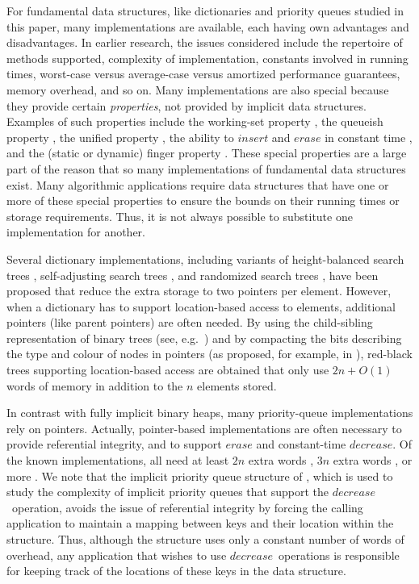 \documentclass{DIKU-article}
\newcommand{\Insert}{\mbox{$\mathit{insert}$}}
\newcommand{\Erase}{\mbox{$\mathit{erase}$}}
\newcommand{\Decrease}{\mbox{$\mathit{decrease}$}}
\begin{document}
For fundamental data structures, like dictionaries and
priority queues studied in this paper, many implementations
are available, each having own advantages and disadvantages.  In
earlier research, the issues considered include the repertoire of
methods supported, complexity of implementation, constants involved
in running times, worst-case versus average-case versus amortized
performance guarantees, memory overhead, and so on.  Many
implementations are also special because they provide certain
\emph{properties}, not provided by implicit data structures.  Examples
of such properties include the working-set property \cite{i01,st85b},
the queueish property \cite{il02}, the unified property
\cite{i01,st85b}, the ability to \Insert{} and \Erase{} in constant
time \cite{Fle96,hm82,LO88}, and the (static or dynamic) finger
property \cite{as96,bt80,c95,gmpr77,hm82}.  These special properties
are a large part of the reason that so many implementations of
fundamental data structures exist.  Many algorithmic applications require
data structures that have one or more of these special properties to ensure the
bounds on their running times or storage requirements.  Thus, it is
not always possible to substitute one implementation for another.

Several dictionary implementations, including variants of
height-balanced search trees \cite{Bro79}, self-adjusting search trees
\cite{And99,gr93,st85b}, and randomized search trees \cite{as96,p90},
have been proposed that reduce the extra storage to two pointers per
element. However, when a dictionary has to support
location-based access to elements, additional pointers (like parent
pointers) are often needed. By using the child-sibling representation
of binary trees (see, e.g.~\cite[Section 4.1]{Tar83}) and by
compacting the bits describing the type and colour of nodes in pointers (as proposed, for example, in
\cite{BK06}), red-black trees supporting location-based access are
obtained that only use $2n + O(1)$ words of memory in addition to the
$n$ elements stored.

In contrast with fully implicit binary heaps, many priority-queue
implementations rely on pointers. Actually, pointer-based
implementations are often necessary to provide referential integrity,
and to support \Erase{} and constant-time \Decrease{}. Of the known
implementations, all need at least $2n$ extra words \cite{DW93,MP05},
$3n$ extra words \cite{EJK05}, or more \cite{DGST88,KST02}.  We note
that the implicit priority queue structure of \cite{MP05}, which is
used to study the complexity of implicit priority queues that support
the \Decrease\ operation, avoids the issue of referential integrity
by forcing the calling application to maintain a mapping between keys
and their location within the structure.  Thus, although the
structure uses only a constant number of words of overhead, any
application that wishes to use \Decrease\ operations is responsible
for keeping track of the locations of these keys in the data
structure.
\end{document}
